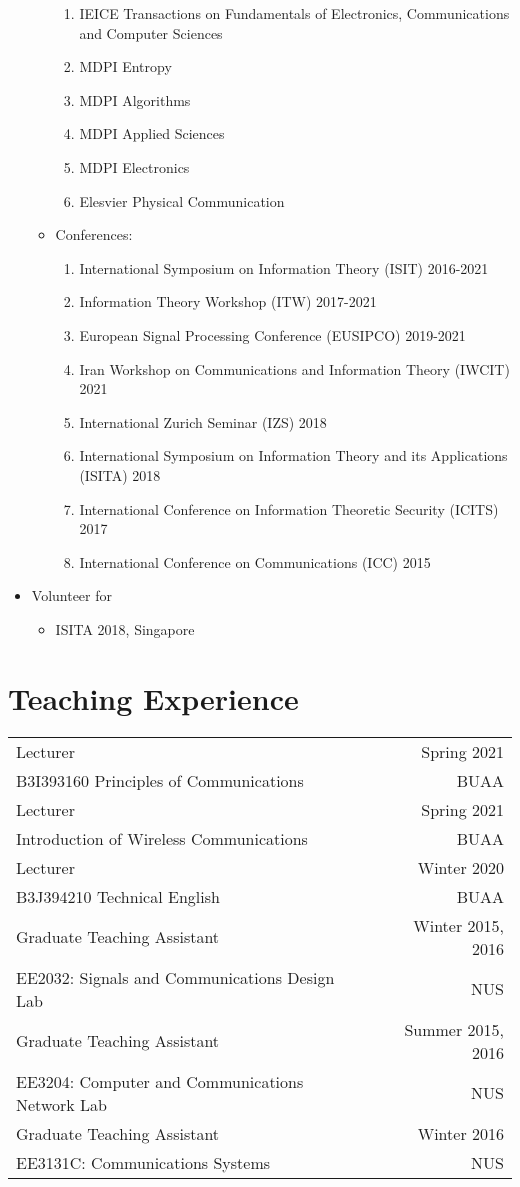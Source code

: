 \documentclass[12pt]{article} %
\begin{document}
\begin{itemize}
\begin{itemize}
\begin{enumerate}
\item IEICE Transactions on Fundamentals of Electronics, Communications and Computer Sciences
\item MDPI Entropy
\item MDPI Algorithms
\item MDPI Applied Sciences
\item MDPI Electronics
\item Elesvier Physical Communication
\end{enumerate}
\item Conferences:
\begin{enumerate}
\item International Symposium on Information Theory (ISIT) 2016-2021
\item Information Theory Workshop (ITW) 2017-2021
\item European Signal Processing Conference (EUSIPCO) 2019-2021
\item Iran Workshop on Communications and Information Theory (IWCIT) 2021
\item International Zurich Seminar (IZS) 2018
\item International Symposium on Information Theory and its Applications (ISITA) 2018
\item International Conference on Information Theoretic Security (ICITS) 2017
\item International Conference on Communications (ICC) 2015
\end{enumerate}
\end{itemize}
\item Volunteer for 
\begin{itemize}
\item ISITA 2018, Singapore
\end{itemize}
\end{itemize}

\section{Teaching Experience}

\begin{tabular}{lr}
Lecturer&Spring 2021\\
B3I393160 Principles of Communications&BUAA\\
Lecturer&Spring 2021\\
Introduction of Wireless Communications&BUAA\\
Lecturer&Winter 2020\\
B3J394210 Technical English&BUAA\\
Graduate Teaching Assistant&Winter 2015, 2016\\
EE2032: Signals and Communications Design Lab& NUS\\
Graduate Teaching Assistant&Summer 2015, 2016\\
EE3204: Computer and Communications Network Lab& NUS\\
Graduate Teaching Assistant&Winter 2016\\
EE3131C: Communications Systems& NUS\\
\end{tabular}
\end{document}
